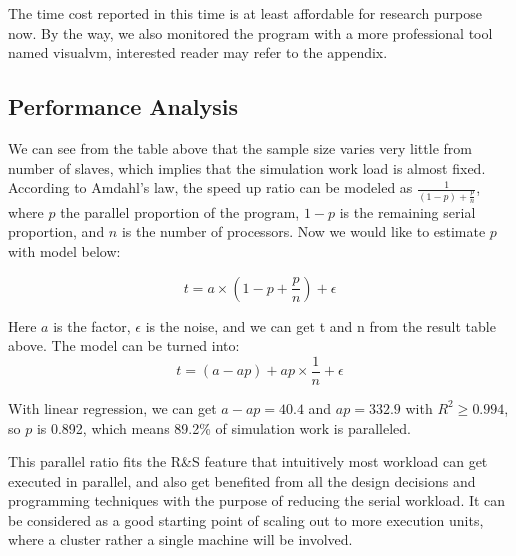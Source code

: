 The time cost reported in this time is at least affordable for research purpose now. By the way, we also monitored the program with a more professional tool named visualvm, interested reader may refer to the appendix.

\subsection{Performance Analysis}

We can see from the table above that the sample size varies very little from number of slaves, which implies that the simulation work load is almost fixed. According to Amdahl's law, the speed up ratio can be modeled as $\frac{1}{(1 - p) + \frac{p}{n}}$, where $p$ the parallel proportion of the program, $1 - p$ is the remaining serial proportion, and $n$ is the number of processors. Now we would like to estimate $p$ with model below:

$$ t = a \times (1 - p + \frac{p}{n}) + \epsilon $$

Here $a$ is the factor, $\epsilon$ is the noise, and we can get t and n from the result table above. The model can be turned into: 
$$ t = (a - ap) + ap \times \frac{1}{n} + \epsilon $$

With linear regression, we can get $a - ap = 40.4$ and $ap = 332.9$ with $R^2 \geqslant 0.994$, so $p$ is 0.892, which means 89.2\% of simulation work is paralleled.

This parallel ratio fits the R\&S feature that intuitively most workload can get executed in parallel, and also get benefited from all the design decisions and programming techniques with the purpose of reducing the serial workload. It can be considered as a good starting point of scaling out to more execution units, where a cluster rather a single machine will be involved.

